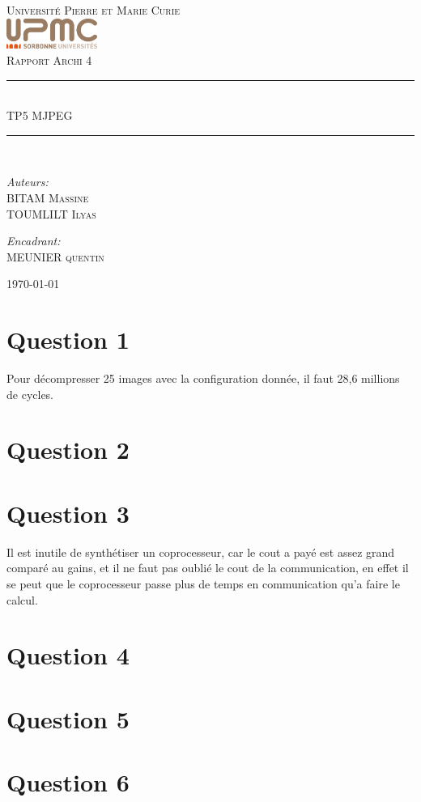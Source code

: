 \documentclass[12pt]{article}
\newcommand{\HRule}{\rule{\linewidth}{0.5mm}}
\begin{document}
\begin{titlepage}
  \begin{center}
    \textsc{\LARGE Université Pierre et Marie Curie}\\[1.5cm]
    \includegraphics[height=1cm]{upmc.png}\\[1.5cm]
    \textsc{\Large Rapport Archi 4 }\\[2cm]
    \HRule \\[1cm]
    \textsc{\huge TP5 MJPEG }\\[0.5cm]
    \HRule \\[1cm]
    \noindent
    \begin{minipage}[t]{0.55\textwidth}
      \begin{flushleft} \large
        \emph{Auteurs:}\\
        BITAM \textsc{Massine}\\
        TOUMLILT \textsc{Ilyas}
      \end{flushleft}
    \end{minipage}%
    \begin{minipage}[t]{0.47\textwidth}
      \begin{flushright} \large
        \emph{Encadrant:} \\
        MEUNIER \textsc{quentin}
      \end{flushright}
    \end{minipage}
    \vfill
    {\large \today}
  \end{center}
\end{titlepage}
\section*{Question 1}
Pour décompresser 25 images avec la configuration donnée, il faut 28,6 millions de cycles.
\section*{Question 2}
\section*{Question 3}
Il est inutile de synthétiser un coprocesseur, car le cout a payé est assez grand comparé au gains, et il ne faut pas oublié le cout de la communication, en effet il se peut que le coprocesseur passe plus de temps en communication qu'a faire le calcul.
\section*{Question 4}
\section*{Question 5}
\section*{Question 6}
\end{document}
